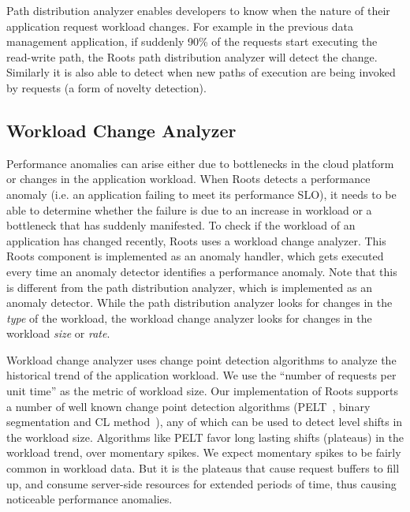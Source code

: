 Path distribution analyzer enables developers to know when the nature of their application request
workload changes. For example in the previous data management application, if suddenly 90\%
of the requests start executing the read-write path, the Roots path distribution analyzer will
detect the change. Similarly it is also able to detect when new paths of execution
are being invoked by requests (a form of novelty detection).

\subsection{Workload Change Analyzer}

Performance anomalies can arise either due to bottlenecks in the cloud platform or 
changes in the application workload.
When Roots detects a performance anomaly (i.e. an application failing to meet its performance SLO),
it needs to be able to determine whether the failure is due
to an increase in workload or a bottleneck that has suddenly manifested.
To check if the workload of an application has changed recently, Roots uses a workload change analyzer.
This Roots component  is implemented as an anomaly handler, which gets executed every time an 
anomaly detector
identifies a performance anomaly. Note that this is different from the path distribution analyzer,
which is implemented as an anomaly detector. While the path distribution analyzer looks for changes in the
\textit{type} of the workload, the workload change analyzer looks for changes
in the workload \textit{size} or \textit{rate}. 

Workload change analyzer uses change point detection algorithms to analyze the historical trend of 
the application workload. We use the ``number of requests
per unit time'' as the metric of workload size. 
Our implementation of Roots supports a number of well known change point
detection algorithms (PELT~\cite{doi:10.1080/01621459.2012.737745}, binary segmentation 
and CL method~\cite{chen1993joint}), any of which can be used to detect level shifts in the
workload size. Algorithms like PELT favor long lasting shifts (plateaus) in the workload trend, over momentary spikes.
We expect momentary spikes to be fairly common in workload data. But it is the plateaus that cause
request buffers to fill up, and consume server-side resources for extended periods of time, thus
causing noticeable performance anomalies.

